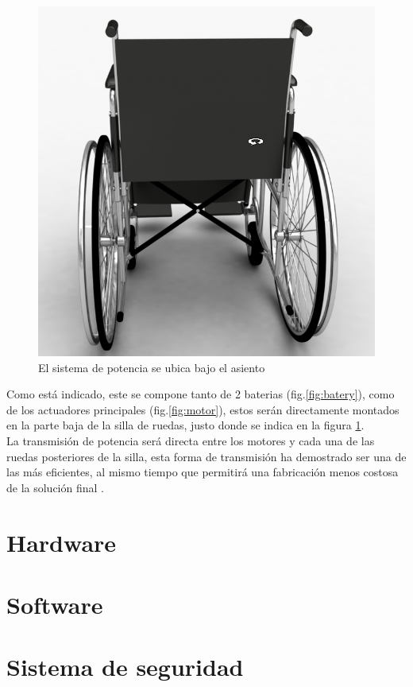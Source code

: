 \begin{figure}
    \centering
    \includegraphics[width=.5\textwidth]{Figures/wheel_back.png}
    \decoRule
    \caption{El sistema de potencia se ubica bajo el asiento}
    \label{fig:back}
\end{figure}
Como est\'a indicado, este se compone tanto de 2 baterias
(fig.\ref{fig:batery}), como de los actuadores principales
(fig.\ref{fig:motor}), estos ser\'an directamente montados en la parte baja de
la silla de ruedas, justo donde se indica en la figura \ref{fig:back}.\\
La transmisi\'on de potencia ser\'a directa entre los motores y cada una de las
ruedas posteriores de la silla, esta forma de transmisi\'on ha demostrado ser
una de las m\'as eficientes, al mismo tiempo que permitir\'a una fabricaci\'on
menos costosa de la soluci\'on final \parencite{motorized}.


\section{Hardware}
\section{Software}
\section{Sistema de seguridad}

